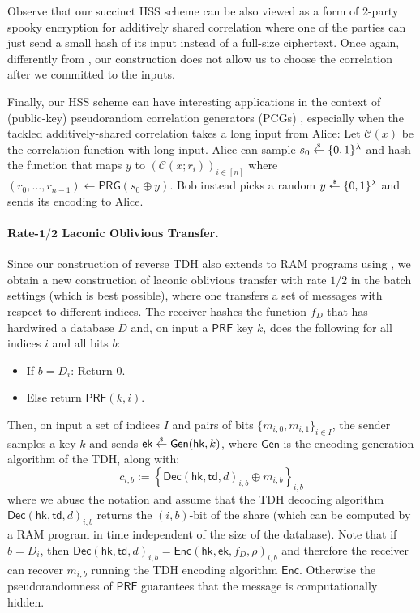 \documentclass{theoretics}
\newcommand{\ek}{\mathsf{ek}}
\newcommand{\td}{\mathsf{td}}
\newcommand{\getsr}{\overset{\raisebox{-1pt}{$\scriptscriptstyle \$$}}{\gets}}
\newcommand{\sample}{\getsr}
\renewcommand{\sec}{\ensuremath{\lambda}}
\newcommand{\algofont}[1]{\ensuremath{\mathsf{#1}}}
\newcommand{\Enc}{{\algofont{Enc}}}
\newcommand{\Dec}{{\algofont{Dec}}}
\newcommand{\Gen}{{\algofont{Gen}}}
\newcommand{\hk}{\ensuremath{\mathsf{hk}}}
\begin{document}
Observe that our succinct HSS scheme can be also viewed as a form of 2-party spooky encryption for additively shared correlation \cite{C:DHRW16} where one of the parties can just send a small hash of its input instead of a full-size ciphertext. Once again, differently from \cite{C:DHRW16}, our construction does not allow us to choose the correlation after we committed to the inputs.

Finally, our HSS scheme can have interesting applications in the context of (public-key) pseudorandom correlation generators (PCGs) \cite{C:BCGIKS19,EC:OrlSchYak21,EC:AbrSchYak22}, especially when the tackled additively-shared correlation takes a long input from Alice: Let $\mathcal{C}(x)$ be the correlation function with long input. Alice can sample $s_0\sample\{0, 1\}^\sec$ and hash the function that maps $y$ to $(\mathcal{C}(x; r_i))_{i\in[n]}$ where $(r_0, \dots, r_{n-1})\gets \mathsf{PRG}(s_0\oplus y)$. Bob instead picks a random $y\sample\{0, 1\}^\sec$ and sends its encoding to Alice.



\paragraph{Rate-$\mathbf{1/2}$ Laconic Oblivious Transfer.} Since our construction of reverse TDH also extends to RAM programs using \cite{C:DHMWW24}, we obtain a new construction of laconic oblivious transfer \cite{C:CDGGMP17} with rate $1/2$ in the batch settings (which is best possible), where one transfers a set of messages with respect to different indices. The receiver hashes the function $f_D$ that has hardwired a database $D$ and, on input a $\mathsf{PRF}$ key $k$, does the following for all indices $i$ and all bits $b$:
\begin{itemize}
    \item If $b = D_i$: Return $0$.
    \item Else return $\mathsf{PRF}(k, i)$.
\end{itemize}
Then, on input a set of indices $I$ and pairs of bits $\{m_{i,0}, m_{i,1}\}_{i\in I}$, the sender
samples a key $k$ and sends $\ek \sample \Gen(\hk, k)$, where $\Gen$ is the encoding generation algorithm of the TDH, along with:
\[
c_{i,b} := \left\{\Dec(\hk, \td, d)_{i,b} \oplus m_{i,b}\right\}_{i,b}
\]
where we abuse the notation and assume that the TDH decoding algorithm $\Dec(\hk, \td, d)_{i,b}$ returns the $(i,b)$-bit of the share (which can be computed by a RAM program in time independent of the size of the database). Note that if $b = D_i$, then $\Dec(\hk, \td, d)_{i,b} = \Enc(\hk, \ek, f_D, \rho)_{i,b}$ and therefore the receiver can recover $m_{i,b}$ running the TDH encoding algorithm $\Enc$. Otherwise the pseudorandomness of $\mathsf{PRF}$ guarantees that the message is computationally hidden.
\end{document}

